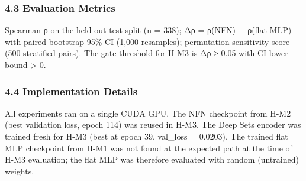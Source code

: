 \subsubsection{4.3 Evaluation Metrics}

Spearman ρ on the held-out test split (n = 338); Δρ = ρ(NFN) − ρ(flat MLP) with paired bootstrap 95\% CI (1,000 resamples); permutation sensitivity score (500 stratified pairs). The gate threshold for H-M3 is Δρ ≥ 0.05 with CI lower bound > 0.

\subsubsection{4.4 Implementation Details}

All experiments ran on a single CUDA GPU. The NFN checkpoint from H-M2 (best validation loss, epoch 114) was reused in H-M3. The Deep Sets encoder was trained fresh for H-M3 (best at epoch 39, val_loss = 0.0203). The trained flat MLP checkpoint from H-M1 was not found at the expected path at the time of H-M3 evaluation; the flat MLP was therefore evaluated with random (untrained) weights.

